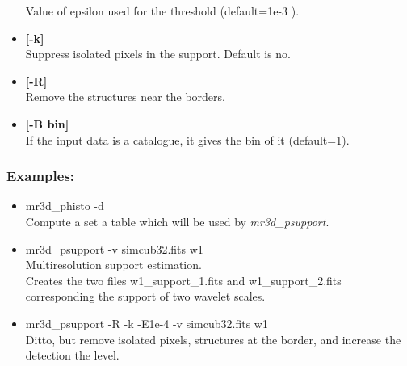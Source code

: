 \begin{itemize}
Value of epsilon used for the threshold (default=1e-3 ).
\item {\bf [-k]}  \\
Suppress isolated pixels in the support. Default is no.
\item {\bf [-R]}  \\
  Remove the structures near the borders.
\item {\bf [-B bin]}  \\
 If the input data is a catalogue, it gives the bin of it (default=1).
\end{itemize}


\subsubsection*{Examples:}
\begin{itemize}
\baselineskip=0.4truecm
\itemsep=0.1truecm
\item mr3d\_phisto -d \\
Compute a set a table which will be used by {\em mr3d\_psupport}.
\item mr3d\_psupport -v simcub32.fits w1   \\
Multiresolution support estimation. \\
Creates the two files
w1\_support\_1.fits and w1\_support\_2.fits cor\-res\-pon\-ding
the support of two wavelet scales. 
\item mr3d\_psupport -R -k -E1e-4 -v simcub32.fits w1   \\
Ditto, but remove isolated pixels, structures at the border,
and increase the detection the level.
\end{itemize}

